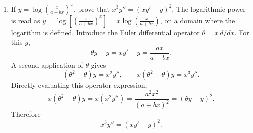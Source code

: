 \begin{enumerate}[leftmargin=4mm,itemsep=9pt]
\[\[\[\addtocounter{enumi}{8}
\item Find the particular solution of $y'+y\tan x=3x^2+x^3\tan x$, given $y=0$ at $x=\pi/3$ and $x\ne\pi/2$.
\solution Set $u=y-x^3$. Substitution into the original equation cancels the known polynomial forcing:
\[
u'+u\tan x=0.
\]
Introduce the transformed independent variable $\tau=\ln(\sec x)$, for which $d\tau/dx=\tan x$. Away from $x=0$, the equation becomes the autonomous first-order system
\[
\frac{du}{d\tau}+u=0.
\]
At the initial point $x_0=\pi/3$, $\tau_0=\ln2$ and $u_0=-\pi^3/27$. We use unilateral Laplace transforms in a forward coordinate $\sigma=\tau-\tau_0\ge0$:
\[
\mathcal L\{u_\sigma\}=sU_+(s)-u_0,\qquad
(s+1)U_+(s)=u_0.
\]
Hence
\[
U_+(s)=-\frac{\pi^3}{27(s+1)},\qquad
u_+(\sigma)=-\frac{\pi^3}{27}e^{-\sigma}.
\]
For the side $0<x<\pi/3$, use the backward coordinate $\rho=\tau_0-\tau\ge0$. Then $du/d\rho-u=0$, and its unilateral transform gives
\[
(s-1)U_-(s)=u_0,\qquad
U_-(s)=-\frac{\pi^3}{27(s-1)},\qquad
u_-(\rho)=-\frac{\pi^3}{27}e^\rho.
\]
Since $e^{-\sigma}=e^\rho=2\cos x$ on the corresponding branches, both inverse transforms yield the same expression:
\[
u(x)=-\frac{2\pi^3}{27}\cos x,\qquad
\boxed{y(x)=x^3-\frac{2\pi^3}{27}\cos x}.
\]
The transformed coordinate has a turning point at $x=0$; the original equation is nonsingular there, so uniqueness extends this solution through $x=0$ to the full connected interval $-\pi/2<x<\pi/2$ containing the initial point. Direct substitution verifies the original ODE and $y(\pi/3)=0$.
\item If $y=\log\left(\frac{x}{a+bx}\right)^x$, prove that $x^3y''=(xy'-y)^2$.
\solution The logarithmic power is read as $y=\log\!\left[\left(\frac{x}{a+bx}\right)^x\right]=x\log\!\left(\frac{x}{a+bx}\right)$, on a domain where the logarithm is defined. Introduce the Euler differential operator $\theta=x\,d/dx$. For this $y$,
\[
\theta y- y=xy'-y=\frac{ax}{a+bx}.
\]
A second application of $\theta$ gives
\[
(\theta^2-\theta)y=x^2y'',\qquad
x(\theta^2-\theta)y=x^3y''.
\]
Directly evaluating this operator expression,
\[
x(\theta^2-\theta)y
=x\left(x^2y''\right)
=\frac{a^2x^2}{(a+bx)^2}
=(\theta y-y)^2.
\]
Therefore
\[
\boxed{x^3y''=(xy'-y)^2}.
\]

\]\]\]
\end{enumerate}
